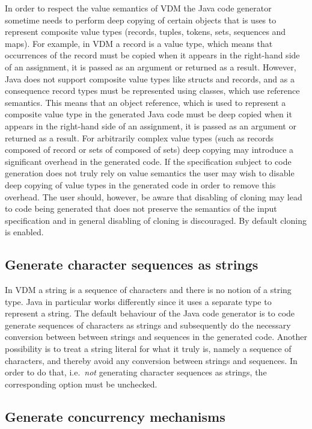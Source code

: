 In order to respect the value semantics of VDM the Java code generator
sometime needs to perform deep copying of certain objects that is uses
to represent composite value types (records, tuples, tokens, sets,
sequences and maps). For example, in VDM a record is a value type,
which means that occurrences of the record must be copied when it
appears in the right-hand side of an assignment, it is passed as an
argument or returned as a result. However, Java does not support
composite value types like structs and records, and as a consequence
record types must be represented using classes, which use reference
semantics. This means that an object reference, which is used to
represent a composite value type in the generated Java code must be
deep copied when it appears in the right-hand side of an assignment,
it is passed as an argument or returned as a result. For arbitrarily
complex value types (such as records composed of record or sets of
composed of sets) deep copying may introduce a significant overhead in
the generated code. If the specification subject to code generation
does not truly rely on value semantics the user may wish to disable
deep copying of value types in the generated code in order to remove
this overhead. The user should, however, be aware that disabling of
cloning may lead to code being generated that does not preserve the
semantics of the input specification and in general disabling of
cloning is discouraged. By default cloning is enabled.

\subsection{Generate character sequences as strings}

In VDM a string is a sequence of characters and there is no notion of
a string type. Java in particular works differently since it uses a
separate type to represent a string. The default behaviour of the Java
code generator is to code generate sequences of characters as strings
and subsequently do the necessary conversion between between strings
and sequences in the generated code. Another possibility is to treat a
string literal for what it truly is, namely a sequence of characters,
and thereby avoid any conversion between strings and sequences. In
order to do that, i.e.\ \textit{not} generating character sequences as
strings, the corresponding option must be unchecked.

\subsection{Generate concurrency mechanisms}

